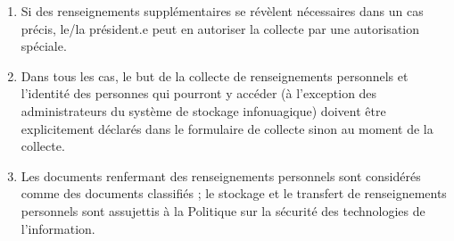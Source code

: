 \begin{enumerate}
  \begin{enumerate}
   \item
    Le nom et le prénom
   \item
    L'adresse courriel
   \item
    Le numéro de téléphone
   \item
    Le statut par rapport aux études, y compris le programme, l\textquotesingle année d\textquotesingle obtention du diplôme, région de l\textquotesingle obtention d\textquotesingle un diplôme d\textquotesingle études secondaires, le nom de l\textquotesingle établissement d\textquotesingle enseignement, le statut d\textquotesingle étudiant étranger (le cas échéant) et les cours suivis
   \item
    La date de naissance
   \item
    Les pronoms personnels
   \item
    La langue de préférence
   \item
    Les besoins particuliers
   \item
    Le genre
   \item
    L'âge
   \item
    Le point de vue sur l'état des programmes de formation en génie dans l'établissement d'enseignement
   \item
    La révélation des expériences personnelles liées aux études
   \item
    Ethnicité
   \item
    Nationalité
  \end{enumerate}
 \item
  Si des renseignements supplémentaires se révèlent nécessaires dans un cas précis, le/la président.e peut en autoriser la collecte par une autorisation spéciale.
 \item
  Dans tous les cas, le but de la collecte de renseignements personnels et l'identité des personnes qui pourront y accéder (à l'exception des administrateurs du système de stockage infonuagique) doivent être explicitement déclarés dans le formulaire de collecte sinon au moment de la collecte.
 \item
  Les documents renfermant des renseignements personnels sont considérés comme des documents classifiés ; le stockage et le transfert de renseignements personnels sont assujettis à la Politique sur la sécurité des technologies de l'information.
\end{enumerate}

